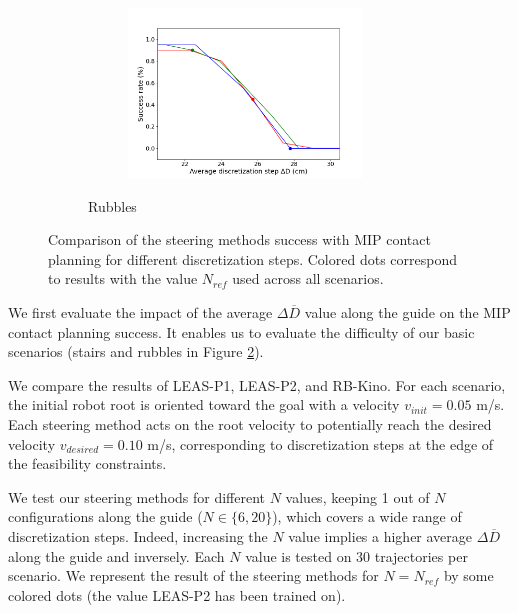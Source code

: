 \begin{figure}[h!]
\begin{subfigure}{0.9\linewidth}
\begin{subfigure}{0.48\linewidth}
        \end{subfigure}
        \begin{subfigure}{0.48\linewidth}
            \includegraphics[trim={0cm 0cm 2cm 1.8cm}, clip,width=\textwidth,height=4.5cm]{Figures/Chapter_MIP_SL1M/res_mip/MIP_res_rubbles/FIGURE_MIP_RUBBLES_2.png}
        \end{subfigure}
        \caption{Rubbles}
        \label{fig:mip:minimizing_basic:2}
    \end{subfigure}
    \caption{Comparison of the steering methods success with MIP contact planning for different discretization steps. Colored dots correspond to results with the value $N_{ref}$ used across all scenarios.}
    \label{fig:mip:minimizing_basic}
\end{figure}
We first evaluate the impact of the average $\Delta \overline{D}$ value along the guide on the MIP contact planning success. 
It enables us to evaluate the difficulty of our basic scenarios (stairs and rubbles in Figure \ref{fig:mip:minimizing_basic}). 

We compare the results of LEAS-P1, LEAS-P2, and RB-Kino.
For each scenario, the initial robot root is oriented toward the goal with a velocity $v_{init}=0.05$ m/s.
Each steering method acts on the root velocity to potentially reach the desired velocity $v_{desired}=0.10$ m/s, corresponding to discretization steps at the edge of the feasibility constraints.%

We test our steering methods for different $N$ values, keeping 1 out of $N$ configurations along the guide ($N \in \{6,20\}$), which covers a wide range of discretization steps.
Indeed, increasing the $N$ value implies a higher average $\Delta \overline{D}$ along the guide and inversely.
Each $N$ value is tested on 30 trajectories per scenario.
We represent the result of the steering methods for $N=N_{ref}$ by some colored dots (the value LEAS-P2 has been trained on).

